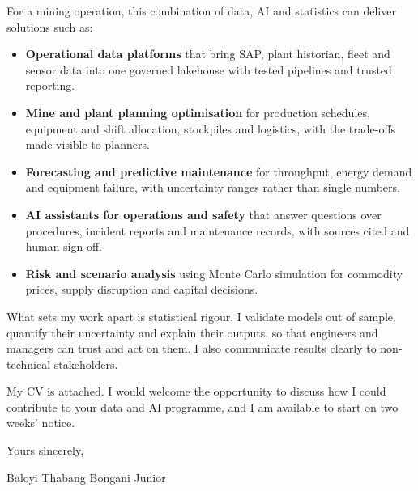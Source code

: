 \documentclass[a4paper,11pt]{article}
\begin{document}
For a mining operation, this combination of data, AI and statistics can deliver solutions such as:
\begin{itemize}[leftmargin=0.2in,itemsep=1pt,topsep=0pt]
    \item \textbf{Operational data platforms} that bring SAP, plant historian, fleet and sensor data into
          one governed lakehouse with tested pipelines and trusted reporting.
    \item \textbf{Mine and plant planning optimisation} for production schedules, equipment and shift
          allocation, stockpiles and logistics, with the trade-offs made visible to planners.
    \item \textbf{Forecasting and predictive maintenance} for throughput, energy demand and equipment
          failure, with uncertainty ranges rather than single numbers.
    \item \textbf{AI assistants for operations and safety} that answer questions over procedures,
          incident reports and maintenance records, with sources cited and human sign-off.
    \item \textbf{Risk and scenario analysis} using Monte Carlo simulation for commodity prices,
          supply disruption and capital decisions.
\end{itemize}

What sets my work apart is statistical rigour. I validate models out of sample, quantify their
uncertainty and explain their outputs, so that engineers and managers can trust and act on them.
I also communicate results clearly to non-technical stakeholders.

My CV is attached. I would welcome the opportunity to discuss how I could contribute to your data and
AI programme, and I am available to start on two weeks' notice.

Yours sincerely,

\vspace{2pt}
Baloyi Thabang Bongani Junior
\end{document}
